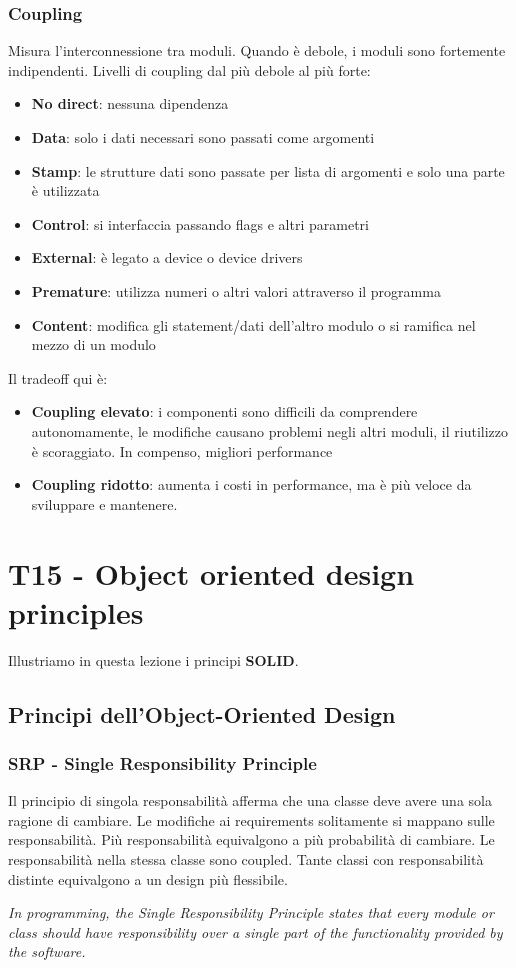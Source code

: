 \documentclass[11pt]{article}
\begin{document}
\subsubsection{Coupling}
Misura l'interconnessione tra moduli. Quando è debole, i moduli sono fortemente indipendenti. Livelli di coupling dal più debole al più forte:
\begin{itemize}
    \item \textbf{No direct}: nessuna dipendenza
    \item \textbf{Data}: solo i dati necessari sono passati come argomenti
    \item \textbf{Stamp}: le strutture dati sono passate per lista di argomenti e solo una parte è utilizzata 
    \item \textbf{Control}: si interfaccia passando flags e altri parametri 
    \item \textbf{External}: è legato a device o device drivers
    \item \textbf{Premature}: utilizza numeri o altri valori attraverso il programma 
    \item \textbf{Content}: modifica gli statement/dati dell'altro modulo o si ramifica nel mezzo di un modulo
\end{itemize}
Il tradeoff qui è:
\begin{itemize}
    \item \textbf{Coupling elevato}: i componenti sono difficili da comprendere autonomamente, le modifiche causano problemi negli altri moduli, il riutilizzo è scoraggiato. In compenso, migliori performance 
    \item \textbf{Coupling ridotto}: aumenta i costi in performance, ma è più veloce da sviluppare e mantenere.
\end{itemize}
\section{T15 - Object oriented design principles}
Illustriamo in questa lezione i principi \textbf{SOLID}.
\subsection{Principi dell'Object-Oriented Design}
\subsubsection{SRP - Single Responsibility Principle}
Il principio di singola responsabilità afferma che una classe deve avere una sola ragione di cambiare. Le modifiche ai requirements solitamente si mappano sulle responsabilità. Più responsabilità equivalgono a più probabilità di cambiare. Le responsabilità nella stessa classe sono coupled.
Tante classi con responsabilità distinte equivalgono a un design più flessibile. 
\begin{center}
    \textit{In programming, the Single Responsibility Principle states that every module or class should have responsibility over a single part of the functionality provided by the software.}
\end{center}
\end{document}
